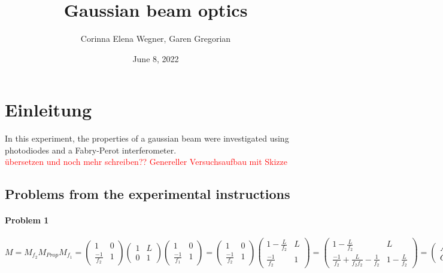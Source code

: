 \documentclass{article}
\begin{document}
 

\begin{titlepage}
\title{Gaussian beam optics}
\author{Corinna Elena Wegner, Garen Gregorian}
\date{June 8, 2022}
\maketitle %
\end{titlepage}

\newpage
\tableofcontents
\newpage

\section{Einleitung} 

In this experiment, the properties of a gaussian beam were investigated using photodiodes and a Fabry-Perot interferometer.
\\
\textcolor{red}{übersetzen und noch mehr schreiben??}
\textcolor{red}{Genereller Versuchsaufbau mit Skizze}

\subsection{Problems from the experimental instructions}

\paragraph{Problem 1}
 $M = M_{f_2}M_{Prop}M_{f_1}=\begin{pmatrix}1 & 0\\ \frac{-1}{f_2} & 1
\end{pmatrix}\begin{pmatrix}1 & L\\ 0 & 1
\end{pmatrix}\begin{pmatrix}1 & 0\\ \frac{-1}{f_1} & 1
\end{pmatrix} =\begin{pmatrix}1 & 0\\ \frac{-1}{f_2} & 1
\end{pmatrix}\begin{pmatrix} 1-\frac{L}{f_2} & L\\ \frac{-1}{f_2} & 1
\end{pmatrix} = \begin{pmatrix} 1-\frac{L}{f_2} & L\\ \frac{-1}{f_2}+\frac{L}{f_2 f_2}-\frac{1}{f_2} & 1-\frac{L}{f_2}
\end{pmatrix}
 = \begin{pmatrix} A&B\\C&D\end{pmatrix}$
\end{document}
